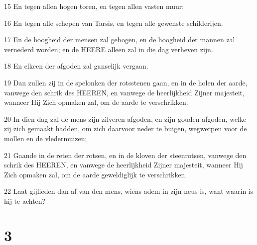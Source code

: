 \par 15 En tegen allen hogen toren, en tegen allen vasten muur;
\par 16 En tegen alle schepen van Tarsis, en tegen alle gewenste schilderijen.
\par 17 En de hoogheid der mensen zal gebogen, en de hoogheid der mannen zal vernederd worden; en de HEERE alleen zal in die dag verheven zijn.
\par 18 En elkeen der afgoden zal ganselijk vergaan.
\par 19 Dan zullen zij in de spelonken der rotsstenen gaan, en in de holen der aarde, vanwege den schrik des HEEREN, en vanwege de heerlijkheid Zijner majesteit, wanneer Hij Zich opmaken zal, om de aarde te verschrikken.
\par 20 In dien dag zal de mens zijn zilveren afgoden, en zijn gouden afgoden, welke zij zich gemaakt hadden, om zich daarvoor neder te buigen, wegwerpen voor de mollen en de vledermuizen;
\par 21 Gaande in de reten der rotsen, en in de kloven der steenrotsen, vanwege den schrik des HEEREN, en vanwege de heerlijkheid Zijner majesteit, wanneer Hij Zich opmaken zal, om de aarde geweldiglijk te verschrikken.
\par 22 Laat gijlieden dan af van den mens, wiens adem in zijn neus is, want waarin is hij te achten?

\chapter{3}

